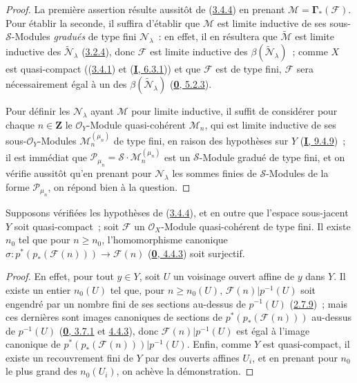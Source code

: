 \begin{proof}
La première assertion résulte aussitôt de
(\hyperref[II.3.4.4-fr]{3.4.4}) en prenant
$\mathcal{M}=\mathbf{\Gamma}_*(\mathcal{F})$. Pour établir la seconde, il suffira
d'établir que $\mathcal{M}$ est limite inductive de ses sous-$\mathcal{S}$-Modules
\emph{gradués} de type fini $\mathcal{N}_\lambda$~: en effet, il en résultera que
$\widetilde{\mathcal{M}}$ est limite inductive des
$\widetilde{\mathcal{N}}_\lambda$
(\hyperref[II.3.2.4-fr]{3.2.4}), donc $\mathcal{F}$ est limite inductive des
$\beta(\widetilde{\mathcal{N}}_\lambda)$~; comme $X$ est quasi-compact
((\hyperref[II.3.4.1-fr]{3.4.1}) et
(\hyperref[I.6.3.1-fr]{\textbf{I}, 6.3.1})) et que $\mathcal{F}$ est de type fini,
$\mathcal{F}$ sera nécessairement égal à un des
$\beta(\widetilde{\mathcal{N}}_\lambda)$
(\hyperref[0.5.2.3-fr]{\textbf{0}, 5.2.3}).

Pour définir les $\mathcal{N}_\lambda$ ayant $\mathcal{M}$ pour limite
inductive, il suffit de considérer pour chaque $n\in\mathbf{Z}$ le
$\mathcal{O}_Y$-Module quasi-cohérent $\mathcal{M}_n$, qui est limite
inductive de ses sous-$\mathcal{O}_Y$-Modules
$\mathcal{M}_n^{(\mu_n)}$ de type fini, en raison des hypothèses sur $Y$
(\hyperref[I.9.4.9-fr]{\textbf{I}, 9.4.9})~; il est immédiat que
$\mathcal{P}_{\mu_n}=\mathcal{S}\cdot\mathcal{M}_n^{(\mu_n)}$ est un
$\mathcal{S}$-Module gradué de type fini, et on vérifie aussitôt qu'en prenant
pour $\mathcal{N}_\lambda$ les sommes finies de $\mathcal{S}$-Modules de la
forme $\mathcal{P}_{\mu_n}$, on répond bien à la question.
\end{proof}

\begin{corollary}[3.4.6]
\label{II.3.4.6-fr}
Supposons vérifiées les hypothèses de \textup{(\hyperref[II.3.4.4-fr]{3.4.4})}, et en
outre que l'espace sous-jacent $Y$ soit quasi-compact~; soit $\mathcal{F}$ un
$\mathcal{O}_X$-Module quasi-cohérent de type fini. Il existe $n_0$ tel que
pour $n\geq n_0$, l'homomorphisme canonique
$\sigma:p^*(p_*(\mathcal{F}(n)))\to\mathcal{F}(n)$
\textup{(\hyperref[0.4.4.3-fr]{\textbf{0}, 4.4.3})} soit surjectif.
\end{corollary}

\begin{proof}
En effet, pour tout $y\in Y$, soit $U$ un voisinage ouvert affine de $y$ dans
$Y$. Il existe un entier $n_0(U)$ tel que, pour $n\geq n_0(U)$,
$\mathcal{F}(n)|p^{-1}(U)$ soit engendré par un nombre fini de ses sections
au-dessus de $p^{-1}(U)$ (\hyperref[II.2.7.9-fr]{2.7.9})~; mais ces dernières
sont images canoniques de sections de $p^*(p_*(\mathcal{F}(n)))$ au-dessus de
$p^{-1}(U)$ (\hyperref[0.3.7.1-fr]{\textbf{0}, 3.7.1} et
\hyperref[0.4.4.3-fr]{4.4.3}), donc
$\mathcal{F}(n)|p^{-1}(U)$ est égal à l'image canonique de
$p^*(p_*(\mathcal{F}(n)))|p^{-1}(U)$. Enfin, comme $Y$ est quasi-compact, il
existe un recouvrement fini de $Y$ par des ouverts affines $U_i$, et en
prenant pour $n_0$ le plus grand des $n_0(U_i)$, on achève la démonstration.
\end{proof}

